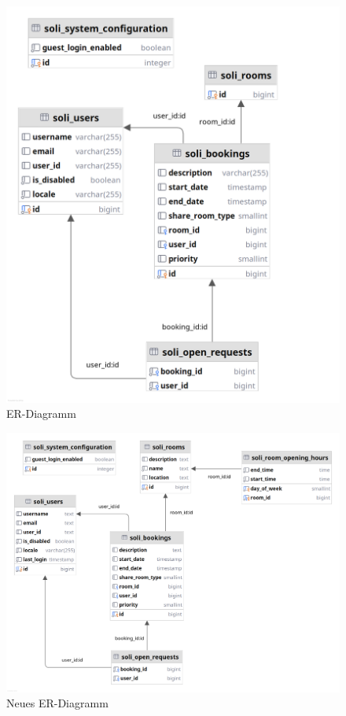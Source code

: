 \begin{figure}[ht]
    \centering
    \includegraphics[width=\textwidth]{figures/database_old}
    \caption{ER-Diagramm}
    \label{fig:er_diagramm}
\end{figure}

\begin{figure}[ht]
    \centering
    \includegraphics[width=\textwidth]{figures/database_new}
    \caption{Neues ER-Diagramm}
    \label{fig:er_diagramm_new}
\end{figure}


